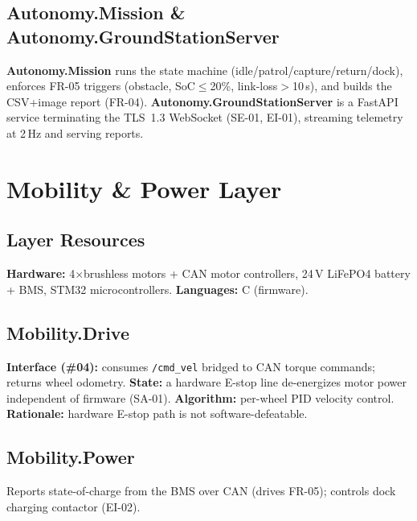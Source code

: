 \documentclass[11pt,letterpaper]{article}
\begin{document}
\subsection{Autonomy.Mission \& Autonomy.GroundStationServer}
\textbf{Autonomy.Mission} runs the state machine (idle/patrol/capture/return/dock),
enforces FR-05 triggers (obstacle, SoC$\leq$20\%, link-loss$>$10\,s), and builds the
CSV+image report (FR-04). \textbf{Autonomy.GroundStationServer} is a FastAPI service
terminating the TLS~1.3 WebSocket (SE-01, EI-01), streaming telemetry at 2\,Hz and
serving reports.

\section{Mobility \& Power Layer}
\subsection{Layer Resources}
\textbf{Hardware:} 4$\times$brushless motors + CAN motor controllers, 24\,V LiFePO4
battery + BMS, STM32 microcontrollers. \textbf{Languages:} C (firmware).
\subsection{Mobility.Drive}
\textbf{Interface (\#04):} consumes \texttt{/cmd\_vel} bridged to CAN torque
commands; returns wheel odometry. \textbf{State:} a hardware E-stop line
de-energizes motor power independent of firmware (SA-01). \textbf{Algorithm:}
per-wheel PID velocity control. \textbf{Rationale:} hardware E-stop path is not
software-defeatable.
\subsection{Mobility.Power}
Reports state-of-charge from the BMS over CAN (drives FR-05); controls dock
charging contactor (EI-02).
\end{document}

